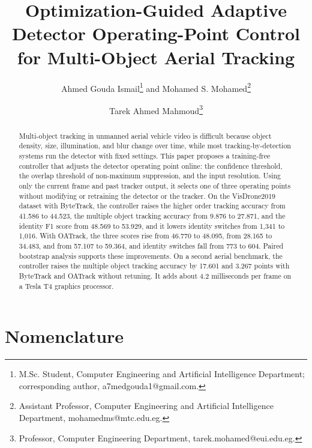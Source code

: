 \documentclass[journal]{new-aiaa}
\title{Optimization-Guided Adaptive Detector Operating-Point Control for Multi-Object Aerial Tracking}
\author{Ahmed Gouda Ismail\footnote{M.Sc. Student, Computer Engineering and Artificial Intelligence Department; corresponding author, a7medgouda1@gmail.com.} and Mohamed S. Mohamed\footnote{Assistant Professor, Computer Engineering and Artificial Intelligence Department, mohamedms@mtc.edu.eg.}}
\affil{Military Technical College, Cairo, Egypt}
\author{Tarek Ahmed Mahmoud\footnote{Professor, Computer Engineering Department, tarek.mohamed@eui.edu.eg.}}
\affil{Egypt University of Informatics, Cairo, Egypt}
\begin{document}
\maketitle

\begin{abstract}
Multi-object tracking in unmanned aerial vehicle video is difficult because object density, size, illumination, and blur change over time, while most tracking-by-detection systems run the detector with fixed settings. This paper proposes a training-free controller that adjusts the detector operating point online: the confidence threshold, the overlap threshold of non-maximum suppression, and the input resolution. Using only the current frame and past tracker output, it selects one of three operating points without modifying or retraining the detector or the tracker. On the VisDrone2019 dataset with ByteTrack, the controller raises the higher order tracking accuracy from 41.586 to 44.523, the multiple object tracking accuracy from 9.876 to 27.871, and the identity F1 score from 48.569 to 53.929, and it lowers identity switches from 1,341 to 1,016. With OATrack, the three scores rise from 46.770 to 48.095, from 28.165 to 34.483, and from 57.107 to 59.364, and identity switches fall from 773 to 604. Paired bootstrap analysis supports these improvements. On a second aerial benchmark, the controller raises the multiple object tracking accuracy by 17.601 and 3.267 points with ByteTrack and OATrack without retuning. It adds about 4.2 milliseconds per frame on a Tesla T4 graphics processor.
\end{abstract}

\section*{Nomenclature}
\end{document}
